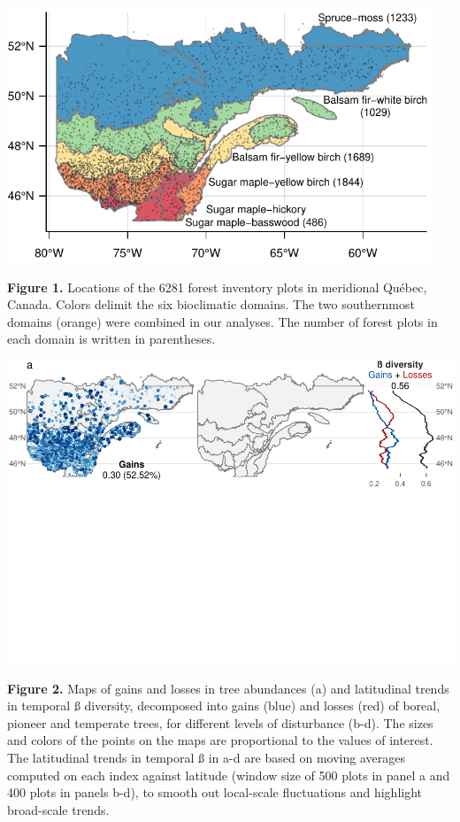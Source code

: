 \documentclass[a4paperpaper,]{article}
\begin{document}
\includegraphics[width=5in,height=\textheight]{ms/figures/fig1_region.pdf}

\textbf{Figure 1.} Locations of the 6281 forest inventory plots in
meridional Québec, Canada. Colors delimit the six bioclimatic domains.
The two southernmost domains (orange) were combined in our analyses. The
number of forest plots in each domain is written in parentheses.

\pagebreak

\includegraphics[width=6.7in,height=\textheight]{ms/figures/fig2_map_roll.pdf}

\textbf{Figure 2.} Maps of gains and losses in tree abundances (a) and
latitudinal trends in temporal ß diversity, decomposed into gains (blue)
and losses (red) of boreal, pioneer and temperate trees, for different
levels of disturbance (b-d). The sizes and colors of the points on the
maps are proportional to the values of interest. The latitudinal trends
in temporal ß in a-d are based on moving averages computed on each index
against latitude (window size of 500 plots in panel a and 400 plots in
panels b-d), to smooth out local-scale fluctuations and highlight
broad-scale trends.
\end{document}
